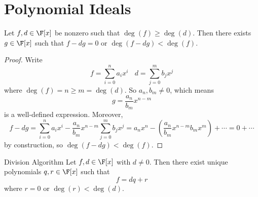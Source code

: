 \documentclass[linearalgebraII]{subfiles}
\begin{document}
    \section{Polynomial Ideals}

    \clearpage
    \begin{lemma}{}
        Let $f,d\in \F[x]$ be nonzero such that $\deg(f)\geq\deg(d)$. Then there exists $g\in \F[x]$ such that $f-dg = 0$ or $\deg(f-dg) < \deg(f)$.
    \end{lemma}

    \begin{proof}
        Write
        \begin{equation*}
            f = \sum^n_{i=0} a_ix^i \ \ \ \ d = \sum^m_{j=0} b_jx^j
        \end{equation*}
        where $\deg(f) = n \geq m = \deg(d)$. So $a_n, b_m\neq 0$, which means
        \begin{equation*}
            g = \frac{a_n}{b_m}x^{n-m}
        \end{equation*}
        is a well-defined expression. Moreover,
        \begin{equation*}
            f - dg = \sum^n_{i=0} a_ix^i - \frac{a_n}{b_m}x^{n-m} \sum^m_{j=0} b_jx^j = a_nx^n - \left(\frac{a_n}{b_m}x^{n-m} b_mx^m\right) + \cdots = 0 + \cdots
        \end{equation*}
        by construction, so $\deg(f-dg) < \deg(f)$. 
    \end{proof}

    \begin{theorem}{Division Algorithm}
        Let $f,d\in \F[x]$ with $d\neq 0$. Then there exist unique polynomials $q,r\in \F[x]$ such that
        \begin{equation*}
            f = dq+r
        \end{equation*}
        where $r = 0$ or $\deg(r)<\deg(d)$.
    \end{theorem}
\end{document}
